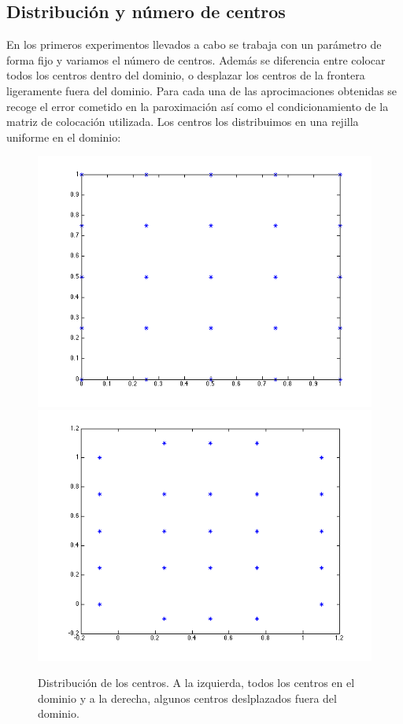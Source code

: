 \documentclass[11pt,a4paper]{article}
\begin{document}
\subsection{Distribución y número de centros}
En los primeros experimentos llevados a cabo se trabaja con un parámetro de forma fijo y variamos el número de centros. Además se diferencia entre colocar todos los centros dentro del dominio, o desplazar los centros de la frontera ligeramente fuera del dominio. Para cada una de las aprocimaciones obtenidas se recoge el error cometido en la paroximación así como el condicionamiento de la matriz de colocación utilizada. Los centros los distribuimos en una rejilla uniforme en el dominio: 
\begin{figure}[H]
\includegraphics[scale=.45]{distribucion1}
\includegraphics[scale=.45]{distribucion2}
\caption{Distribución de los centros. A la izquierda, todos los centros en el dominio y a la derecha, algunos centros deslplazados fuera del dominio. }
\end{figure} 
\end{document}

